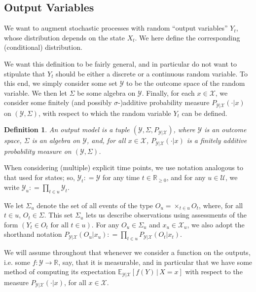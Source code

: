 \documentclass[3p]{elsarticle}
\newtheorem{definition}{Definition}
\newcommand{\reals}{\mathbb{R}}
\newcommand{\realsnonneg}{\reals_{\geq 0}}
\newcommand{\states}{\mathcal{X}}
\newcommand{\observs}{\mathcal{Y}}
\newcommand{\coloneqq}{:\!=}
\begin{document}
\subsection{Output Variables}\label{sec:observs}

We want to augment stochastic processes with random ``output variables'' $Y_t$, whose distribution depends on the state $X_t$. We here define the corresponding (conditional) distribution.

We want this definition to be fairly general, and in particular do not want to stipulate that $Y_t$ should be either a discrete or a continuous random variable. To this end, we simply consider some set $\observs$ to be the outcome space of the random variable. We then let $\Sigma$ be some algebra on $\observs$. Finally, for each $x\in\states$, we consider some finitely (and possibly $\sigma$-)additive probability measure $P_{\observs\vert\states}(\cdot\vert x)$ on $(\observs,\Sigma)$, with respect to which the random variable $Y_t$ can be defined.

\begin{definition}
An \emph{output model} is a tuple $(\observs,\Sigma,P_{\observs\vert \states})$, where $\observs$ is an outcome space, $\Sigma$ is an algebra on $\observs$, and, for all $x\in\states$, $P_{\observs\vert\states}(\cdot\vert x)$ is a finitely additive probability measure on $(\observs,\Sigma)$.
\end{definition}

When considering (multiple) explicit time points, we use notation analogous to that used for states; so, $\observs_t\coloneqq\observs$ for any time $t\in\realsnonneg$, and for any $u\in\mathcal{U}$, we write $\observs_u\coloneqq \prod_{t\in u}\observs_{t}$. 

We let $\Sigma_u$ denote the set of all events of the type $O_u=\times_{t\in u}O_t$, where, for all $t\in u$, $O_{t}\in\Sigma$. 
This set $\Sigma_u$ lets us describe observations using assessments of the form $(Y_t\in O_t \text{~for all $t\in u$})$.   
For any $O_u\in\Sigma_u$ and $x_u\in\states_u$, we also adopt the shorthand notation $P_{\observs\vert\states}(O_u\vert x_u)\coloneqq \prod_{t\in u}P_{\observs\vert\states}(O_t\vert x_t)$.

We will assume throughout that whenever we consider a function on the outputs, i.e. some $f:\observs\to\reals$, say, that it is measurable, and in particular that we have some method of computing its expectation $\mathbb{E}_{\observs\vert\states}[f(Y)\,\vert\,X=x]$ with respect to the measure $P_{\observs\vert\states}(\cdot\vert x)$, for all $x\in\states$.
\end{document}
